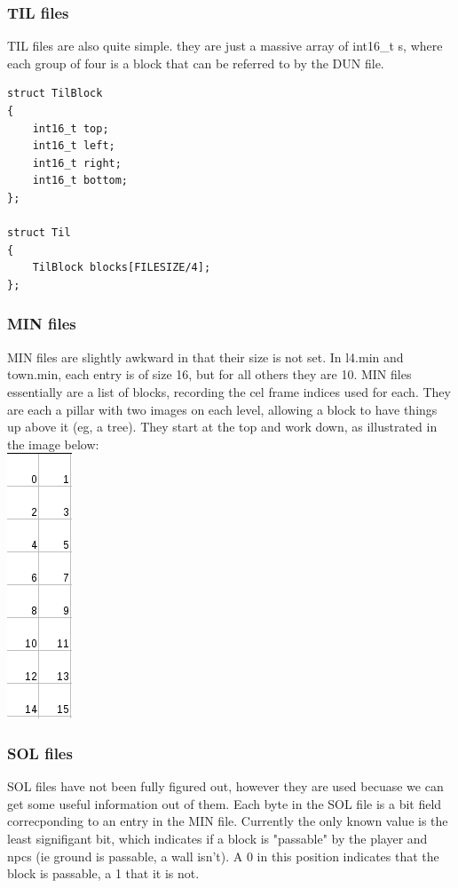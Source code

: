 \documentclass[a4paper]{article}
\begin{document}
    \subsubsection{TIL files}
    TIL files are also quite simple. they are just a massive array of int16\_t s, where each group of four is a block that can be referred to by the DUN file.

    \begin{lstlisting}
struct TilBlock
{
    int16_t top;
    int16_t left;
    int16_t right;
    int16_t bottom;
};

struct Til
{
    TilBlock blocks[FILESIZE/4];
};
    \end{lstlisting}

    \subsubsection{MIN files}
    MIN files are slightly awkward in that their size is not set. In l4.min and town.min, each entry is of size 16, but for all others they are 10.
    MIN files essentially are a list of blocks, recording the cel frame indices used for each. They are each a pillar with two images on each level, allowing a block to have things up above it (eg, a tree). They start at the top and work down, as illustrated in the image below:\\
    \includegraphics{minpillar}
    
    \subsubsection{SOL files}
    SOL files have not been fully figured out, however they are used becuase we can get some useful information out of them.
    Each byte in the SOL file is a bit field correcponding to an entry in the MIN file. Currently the only known value is the least signifigant bit, which indicates if a block is "passable" by the player and npcs (ie ground is passable, a wall isn't). A 0 in this position indicates that the block is passable, a 1 that it is not.


\newpage



\end{document}
